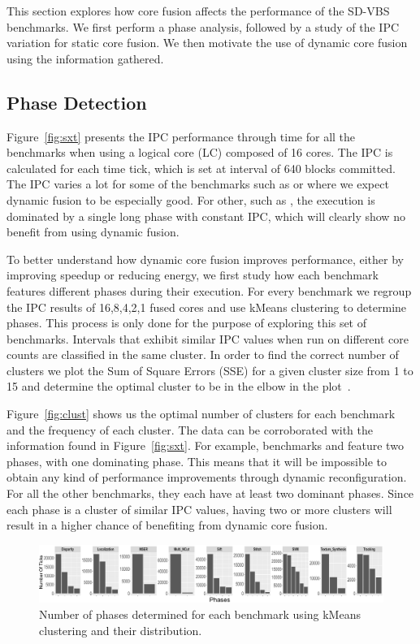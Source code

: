 
This section explores how core fusion affects the performance of the SD-VBS benchmarks.
We first perform a phase analysis, followed by a study of the IPC variation for static core fusion.
We then motivate the use of dynamic core fusion using the information gathered.

\subsection{Phase Detection}
Figure~\ref{fig:sxt} presents the IPC performance through time for all the benchmarks when using a logical core (LC) composed of 16 cores.
The IPC is calculated for each time tick, which is set at interval of 640 blocks committed.
The IPC varies a lot for some of the benchmarks such as  or  where we expect dynamic fusion to be especially good.
For other, such as , the execution is dominated by a single long phase with constant IPC, which will clearly show no benefit from using dynamic fusion.

To better understand how dynamic core fusion improves performance, either by improving speedup or reducing energy, we first study how each benchmark features different phases during their execution.
For every benchmark we regroup the IPC results of 16,8,4,2,1 fused cores and use kMeans clustering to determine phases.
This process is only done for the purpose of exploring this set of benchmarks.
Intervals that exhibit similar IPC values when run on different core counts are classified in the same cluster.
In order to find the correct number of clusters we plot the Sum of Square Errors (SSE) for a given cluster size from 1 to 15 and determine the optimal cluster to be in the elbow in the plot~\cite{everitCluster2001}.

\vspace{5mm}
Figure~\ref{fig:clust} shows us the optimal number of clusters for each benchmark and the frequency of each cluster.
The data can be corroborated with the information found in Figure~\ref{fig:sxt}.
For example, benchmarks  and  feature two phases, with one dominating phase.
This means that it will be impossible to obtain any kind of performance improvements through dynamic reconfiguration.
For all the other benchmarks, they each have at least two dominant phases.
Since each phase is a cluster of similar IPC values, having two or more clusters will result in a higher chance of benefiting from dynamic core fusion.


\begin{figure}[t]
    \centering
    \includegraphics[width=1\textwidth]{graphics/Exploration/clusters2.pdf}
        \vspace*{-7mm}
    \caption{Number of phases determined for each benchmark using kMeans clustering and their distribution.}
    \label{fig:clust}
\label{some example}
\end{figure}

